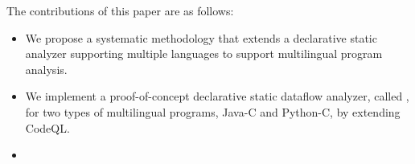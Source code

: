 The contributions of this paper are as follows:
\begin{itemize}
\item We propose a systematic methodology that extends a declarative static analyzer
supporting multiple languages to support multilingual program analysis.

\item We implement a proof-of-concept declarative static dataflow analyzer,
called \ours, for two types of multilingual programs, Java-C and Python-C, by
extending CodeQL.

\item {}

\end{itemize}
